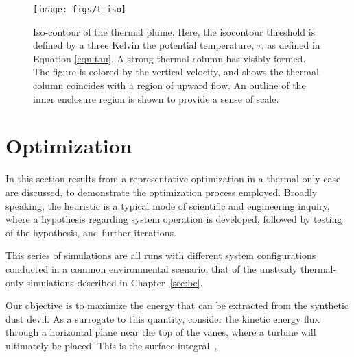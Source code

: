%
%
  \begin{figure}[!htb]
   \begin{center}
    \texttt{[image: figs/t\_iso]}
    \caption{Iso-contour of the thermal plume. Here, the isocontour
    threshold is defined by a three Kelvin the potential temperature,
    $\tau$, as defined in Equation \ref{eqn:tau}. A strong thermal
    column has visibly formed. The figure is colored by the vertical
    velocity, and shows the thermal column coincides with a region of
    upward flow. An outline of the inner enclosure region is shown to
    provide a sense of scale.} 
    \label{fig:field_real}
   \end{center}
  \end{figure}

\section{Optimization}
\label{sec:opt}

In this section results from a representative optimization
in a thermal-only case are discussed, to demonstrate the optimization  
process employed. Broadly speaking, the heuristic is a typical mode of
scientific and engineering inquiry, where a hypothesis regarding system
operation is developed, followed by testing of the hypothesis, and further
iterations.  

This series of simulations are all runs with different system
configurations conducted in a common environmental scenario, that of the
unsteady thermal-only simulations described in Chapter~\ref{sec:bc}. 

Our objective is to maximize the energy that can be 
extracted from the synthetic dust devil. As a surrogate to this
quantity, consider the kinetic energy flux through a horizontal plane
near the top of the vanes, where a turbine will ultimately be
placed. This is the surface integral~\cite{landau1959fm},

%
%
%



